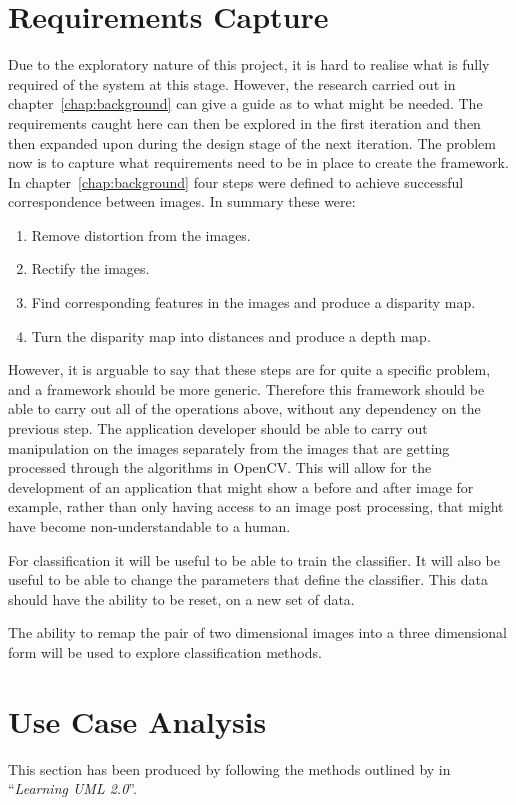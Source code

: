 \documentclass[11pt,oneside]{report}
\begin{document}
		\section{Requirements Capture}
			Due to the exploratory nature of this project, it is hard to realise what is fully required of the system at this stage.
			However, the research carried out in chapter~\ref{chap:background} can give a guide as to what might be needed.
			The requirements caught here can then be explored in the first iteration and then then expanded upon during the design stage of the next iteration.
			The problem now is to capture what requirements need to be in place to create the framework.
			In chapter~\ref{chap:background} four steps were defined to achieve successful correspondence between images.
			In summary these were:
			\begin{enumerate}
				\item Remove distortion from the images.
				\item Rectify the images.
				\item Find corresponding features in the images and produce a disparity map.
				\item Turn the disparity map into distances and produce a depth map.
			\end{enumerate}
			However, it is arguable to say that these steps are for quite a specific problem, and a framework should be more generic.
			Therefore this framework should be able to carry out all of the operations above, without any dependency on the previous step.
			The application developer should be able to carry out manipulation on the images separately from the images that are getting processed through the algorithms in OpenCV.
			This will allow for the development of an application that might show a before and after image for example, rather than only having access to an image post processing, that might have become non-understandable to a human.
			
			For classification it will be useful to be able to train the classifier.
			It will also be useful to be able to change the parameters that define the classifier.
			This data should have the ability to be reset, on a new set of data.
			
			The ability to remap the pair of two dimensional images into a three dimensional form will be used to explore classification methods.
			
		\section{Use Case Analysis}
		This section has been produced by following the methods outlined by  in ``\textit{Learning UML 2.0}''.
\end{document}
